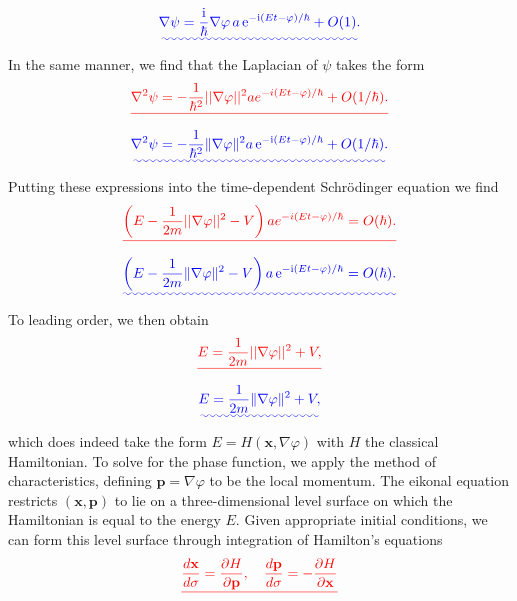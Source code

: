 \documentclass[a4paper,10pt]{paper}
\providecommand{\DIFadd}[1]{{\protect\color{blue}\uwave{#1}}} %
\providecommand{\DIFdel}[1]{{\protect\color{red}\sout{#1}}}                      %
\providecommand{\DIFaddbegin}{} %
\providecommand{\DIFaddend}{} %
\providecommand{\DIFdelbegin}{} %
\providecommand{\DIFdelend}{} %
\begin{document}
\begin{enumerate}
\begin{equation*}
    \DIFadd{\nabla\psi=\frac{\ii}{\hbar}\nabla\varphi\,a\,\ee^{-\ii(Et-\varphi)/\hbar}+O(1).
}\end{equation*}\DIFaddend 
In the same manner, we find that the Laplacian of $\psi$ takes the form
\DIFdelbegin \begin{displaymath}
    \DIFdel{\nabla^{2}\psi=-\frac{1}{\hbar^{2}}||\nabla\varphi||^{2}a e^{-i(Et-\varphi)/\hbar}+O(1/\hbar).
}\end{displaymath}%
\DIFdelend \DIFaddbegin \begin{equation*}
    \DIFadd{\nabla^{2}\psi=-\frac{1}{\hbar^{2}}\|\nabla\varphi\|^{2}a\,\ee^{-\ii(Et-\varphi)/\hbar}+O(1/\hbar).
}\end{equation*}\DIFaddend 
Putting these expressions into the time-dependent Schrödinger equation we find
\DIFdelbegin \begin{displaymath}
    \DIFdel{\left(E-\frac{1}{2m}||\nabla\varphi||^{2}-V\right)a e^{-i(Et-\varphi)/\hbar}=O(\hbar).
}\end{displaymath}%
\DIFdelend \DIFaddbegin \begin{equation*}
    \DIFadd{\left(E-\frac{1}{2m}\|\nabla\varphi\|^{2}-V\right)a\,\ee^{-\ii(Et-\varphi)/\hbar}=O(\hbar).
}\end{equation*}\DIFaddend 
To leading order, we then obtain
\DIFdelbegin \begin{displaymath}
    \DIFdel{E=\frac{1}{2m}||\nabla\varphi||^{2}+V,
}\end{displaymath}%
\DIFdelend \DIFaddbegin \begin{equation*}
    \DIFadd{E=\frac{1}{2m}\|\nabla\varphi\|^{2}+V,
}\end{equation*}\DIFaddend 
which does indeed take the form $E=H(\mathbf{x},\nabla\varphi)$ with $H$ the classical Hamiltonian. To solve for the phase function, we apply the method of characteristics, defining $\mathbf{p}=\nabla\varphi$ to be the local momentum. The eikonal equation restricts $(\mathbf{x}, \mathbf{p})$ to lie on a three-dimensional level surface on which the Hamiltonian is equal to the energy $E$. Given appropriate initial conditions, we can form this level surface through integration of Hamilton's equations
\DIFdelbegin \begin{displaymath}
    \DIFdel{\frac{d\mathbf{x}}{d\sigma}=\frac{\partial H}{\partial \mathbf{p}}, \quad \frac{d\mathbf{p}}{d\sigma}=-\frac{\partial H}{\partial \mathbf{x}}
}\end{displaymath}%
\DIFdelend \DIFaddbegin \begin{equation*}

\end{equation*}
\end{enumerate}
\end{document}
